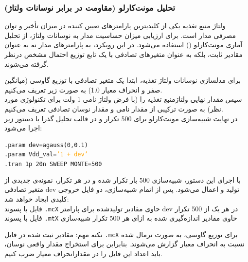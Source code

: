 \newpage

\subsubsection{تحلیل مونت‌کارلو (مقاومت در برابر نوسانات ولتاژ)}


ولتاژ منبع تغذیه یکی از کلیدیترین پارامترهای تعیین کننده در میزان تأخیر و توان مصرفی مدار است.
برای ارزیابی میزان حساسیت مدار به نوسانات ولتاژ، از تحلیل آماری مونت‌کارلو () استفاده می‌شود.
در این رویکرد، به پارامترهای مدار نه به عنوان مقادیر ثابت، بلکه به عنوان متغیرهای تصادفی با یک
تابع توزیع احتمال مشخص درنظر گرفته می‌شوند.

برای مدلسازی نوسانات ولتاژ تغذیه، ابتدا یک متغیر تصادفی با توزیع گاوسی (میانگین صفر و انحراف معیار 1.0)
به صورت زیر تعریف می‌کنیم.\\
سپس مقدار نهایی ولتاژمنبع تغذیه را (با فرض ولتاژ نامی 1 ولت برای تکنولوژی مورد نظر) به صورت ترکیبی
از مقدار نامی و مقدار نوسان تصادفی تعریف می‌کنیم.\\
در نهایت شبیه‌سازی مونت‌کارلو برای 500 تکرار و در قالب تحلیل گذرا با دستور زیر اجرا می‌شود:
\begin{LTR}
    \noindent
    \texttt{.param  dev=agauss(0,0.1)}\\
    \texttt{.param Vdd\_val=\textcolor{orange}{'1 + dev'}}\\
    \texttt{.tran 1p 20n SWEEP MONTE=500}
\end{LTR}
با اجرای این دستور، شبیه‌سازی 500 بار تکرار شده و در هر تکرار، نمونه‌ی جدیدی از متغیر تصادفی dev
تولید و اعمال می‌شود. پس از اتمام شبیه‌سازی، دو فایل خروجی کلیدی ایجاد خواهد شد: \\
فایل با پسوند \texttt{.mcX} حاوی مقادیر تولیدشده برای پارامتر dev در هر یک از 500 تکرار\\
فایل با پسوند \texttt{.mtX} حاوی مقادیر اندازه‌گیری شده به ازای هر 500 تکرار شبیه‌سازی

نکته مهم: مقادیر ثبت‌ شده در فایل \texttt{.mcX} برای توزیع گاوسی، به صورت نرمال شده نسبت به انحراف معیار
گزارش می‌شوند. بنابراین برای استخراج مقدار واقعی نوسان، باید اعداد این فایل را در مقدارانحراف معیار
ضرب کنیم.

